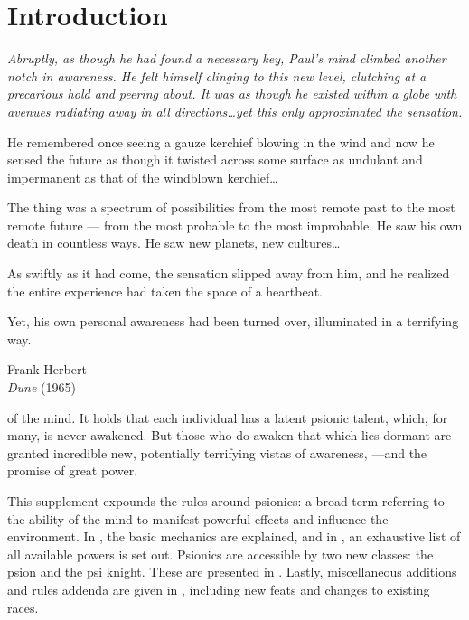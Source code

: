 



\frontmatter
\maketitle
\tableofcontents

\mainmatter%

\chapter{Introduction}
\epigraph{\itshape
  Abruptly, as though he had found a necessary key,
  Paul's mind climbed another notch in awareness.
  He felt himself clinging to this new level,
  clutching at a precarious hold and peering about.
  It was as though he existed within a globe with
  avenues radiating away in all directions\ldots yet this only
  approximated the sensation.
  
  \vspace{2mm}He remembered once seeing a gauze kerchief blowing in
  the wind and now he sensed the future as though it twisted
  across some surface as undulant and impermanent as that of
  the windblown kerchief\ldots
  
  \vspace{2mm}The thing was a spectrum of possibilities from the most
  remote past to the most remote future --- from the most
  probable to the most improbable. He saw his own death in
  countless ways. He saw new planets, new cultures\ldots
  
  \vspace{2mm}As swiftly as it had come, the sensation slipped away from
  him, and he realized the entire experience had taken the space
  of a heartbeat.
  
  \vspace{2mm}Yet, his own personal awareness had been turned over,
  illuminated in a terrifying way.\normalfont}
  {Frank Herbert\\\textit{Dune} (1965)}

of the mind.
It holds that each individual has a latent psionic talent,
which, for many,
is never awakened.
But those who do awaken that which lies dormant
are granted incredible new, potentially terrifying vistas of awareness,
---and the promise of great power.

This supplement expounds the rules around psionics:
a broad term referring to the ability of the mind to manifest
powerful effects and influence the environment.
In ,
the basic mechanics are explained,
and in ,
an exhaustive list of all available powers is set out.
Psionics are accessible by two new classes: the psion
and the psi knight.
These are presented in .
Lastly, miscellaneous additions and rules addenda
are given in ,
including new feats and changes to existing races.\newpage

